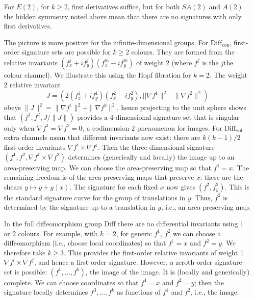 \documentclass{artjlt}
\begin{document}
For $E(2)$, for $k\ge 2$, first derivatives suffice, but for both $SA(2)$ and $A(2)$ the hidden symmetry noted above mean that there are no signatures with only first derivatives. 

The picture is more positive for the infinite-dimensional groups.  For $\mathrm{Diff}_{\mathrm{con}}$, first-order signature sets are possible for $k \ge 2$ colours. They are formed from the relative invariants $(f^j_x + i f^j_y)(f^m_x - i f^m_y)$ of weight 2 (where $f^j$ is the $j$the colour channel). We illustrate this using the Hopf fibration for $k=2$. The weight 2 relative invariant $$J = (2(f^1_x + i f^1_y)(f^2_x - i f^2_y), ||\nabla f^1\|^2 - \|\nabla f^2\|^2)$$ obeys $\|J\|^2 = \|\nabla f^1\|^2 + \|\nabla f^2\|^2$, hence projecting to the unit sphere shows that $(f^1,f^2,J/\|J\|)$ provides a 4-dimensional signature set that is singular only when $\nabla f^1 = \nabla f^2 = 0$, a codimension 2 phenomenon for images. For $\mathrm{Diff}_{\mathrm{vol}}$ extra channels mean that different invariants now exist: there are $k(k-1)/2$ first-order invariants $ \nabla f^i \times \nabla f^j$. Then the three-dimensional signature $ (f^1,f^2, \nabla f^1 \times \nabla f^2)$ determines (generically and locally) the image up to an area-preserving map. We can choose the area-preserving map so that $f^1=x$. The remaining freedom is of the area-preserving maps that preserve $x$: these are the shears $y\mapsto y + g(x)$. The signature for each fixed $x$ now gives $(f^2,f^2_y)$. This is the standard signature curve for the group of translations in $y$. Thus, $f^2$ is determined by the signature up to a translation in $y$, i.e., an area-preserving map.

In the full diffeomorphism group $\mathrm{Diff}$ there are no differential invariants using 1 or 2 colours. For example, with $k=2$, for generic $f^1$, $f^2$ we can choose a diffeomorphism (i.e., choose local coordinates) so that $f^1=x$ and $f^2=y$. We therefore take $k\ge 3$. This provides the first-order relative invariants of weight 1 $\nabla f^i\times \nabla f^j$, and hence a first-order signature. However, a zeroth-order signature set is possible: $(f^1,\dots,f^k)$, the image of the image. It is (locally and generically) complete. We can choose coordinates so that $f^1=x$ and $f^2=y$; then the signature locally determines $f^3,\dots,f^k$ as functions of $f^1$ and $f^2$, i.e., the image.

\end{document}

